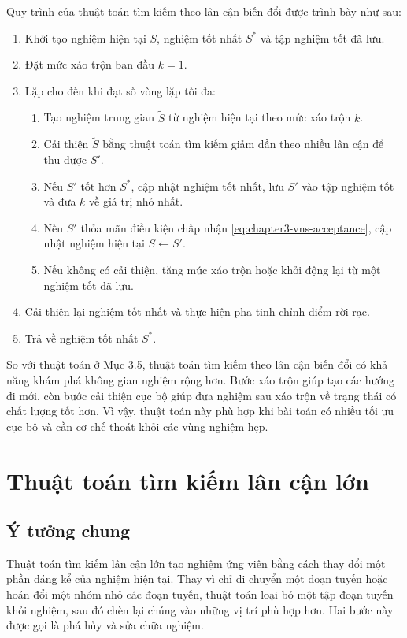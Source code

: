 Quy trình của thuật toán tìm kiếm theo lân cận biến đổi được trình bày như sau:
\begin{enumerate}[leftmargin=1.2cm]
    \item Khởi tạo nghiệm hiện tại $S$, nghiệm tốt nhất $S^*$ và tập nghiệm tốt đã lưu.
    \item Đặt mức xáo trộn ban đầu $k=1$.
    \item Lặp cho đến khi đạt số vòng lặp tối đa:
    \begin{enumerate}[label=(\alph*), leftmargin=1.2cm]
        \item Tạo nghiệm trung gian $\widetilde{S}$ từ nghiệm hiện tại theo mức xáo trộn $k$.
        \item Cải thiện $\widetilde{S}$ bằng thuật toán tìm kiếm giảm dần theo nhiều lân cận để thu được $S'$.
        \item Nếu $S'$ tốt hơn $S^*$, cập nhật nghiệm tốt nhất, lưu $S'$ vào tập nghiệm tốt và đưa $k$ về giá trị nhỏ nhất.
        \item Nếu $S'$ thỏa mãn điều kiện chấp nhận \eqref{eq:chapter3-vns-acceptance}, cập nhật nghiệm hiện tại $S \leftarrow S'$.
        \item Nếu không có cải thiện, tăng mức xáo trộn hoặc khởi động lại từ một nghiệm tốt đã lưu.
    \end{enumerate}
    \item Cải thiện lại nghiệm tốt nhất và thực hiện pha tinh chỉnh điểm rời rạc.
    \item Trả về nghiệm tốt nhất $S^*$.
\end{enumerate}

So với thuật toán ở Mục 3.5, thuật toán tìm kiếm theo lân cận biến đổi có khả năng khám phá không gian nghiệm rộng hơn. Bước xáo trộn giúp tạo các hướng đi mới, còn bước cải thiện cục bộ giúp đưa nghiệm sau xáo trộn về trạng thái có chất lượng tốt hơn. Vì vậy, thuật toán này phù hợp khi bài toán có nhiều tối ưu cục bộ và cần cơ chế thoát khỏi các vùng nghiệm hẹp.

\section{Thuật toán tìm kiếm lân cận lớn}

\subsection{Ý tưởng chung}

Thuật toán tìm kiếm lân cận lớn tạo nghiệm ứng viên bằng cách thay đổi một phần đáng kể của nghiệm hiện tại. Thay vì chỉ di chuyển một đoạn tuyến hoặc hoán đổi một nhóm nhỏ các đoạn tuyến, thuật toán loại bỏ một tập đoạn tuyến khỏi nghiệm, sau đó chèn lại chúng vào những vị trí phù hợp hơn. Hai bước này được gọi là phá hủy và sửa chữa nghiệm.

